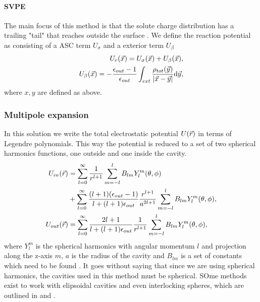 \documentclass[../master_thesis.tex]{subfiles}
\begin{document}
\paragraph{\ac{SVPE}}
The main focus of this method is that the solute charge distribution has a trailing
"tail" that reaches outside the surface \cite{Tomasi:2005ipa}. We define the
reaction potential as consisting of a \ac{ASC} term $U_{\sigma}$ and a exterior
term $U_{\beta}$
\begin{align}
  \begin{split}
    U_r(\vec{x}) = U_{\sigma}(\vec{x}) + U_{\beta}(\vec{x}),\\
    U_{\beta}(\vec{x}) = -\frac{\epsilon_{out} - 1}{\epsilon_{out}}\int_{ext} \frac{\rho_{tot}(\vec{y})}{\abs{\vec{x} - \vec{y}}} \text{d}\vec{y},
  \end{split}
\end{align}
where $x, y$ are defined as above.

\subsubsection{Multipole expansion}
In this solution we write the total electrostatic potential $U(\vec{r})$ in terms
of Legendre polynomials. This way the potential is reduced to a set of two
spherical harmonics functions, one outside and one inside the cavity.
\begin{align}
  \begin{split}
    U_{in}(\vec{r}) &= \sum_{l=0}^{\infty}\frac{1}{r^{l+1}}\sum^l_{m=-l}B_{lm}Y^m_l(\theta, \phi) \\
    &+ \sum_{l=0}^{\infty}\frac{(l+1)(\epsilon_{out} - 1)}{l + (l+1)\epsilon_{out}} \frac{r^{l+1}}{a^{2l+1}}\sum^l_{m=-l}B_{lm}Y^m_l(\theta, \phi),\\
    U_{out}(\vec{r})
    &=\sum_{l=0}^{\infty}\frac{2l+1}{l+(l+1)\epsilon_{out}}\frac{1}{r^{l+1}}\sum^l_{m=-l}B_{lm}Y^m_l(\theta, \phi),
  \end{split}
\end{align}
where $Y^m_l$ is the spherical harmonics with angular momentum $l$ and projection
along the z-axis $m$, $a$ is the radius of the cavity and $B_{lm}$ is a set of
constants which need to be found \cite{Tomasi:1994wt}. It goes without saying that
since we are using spherical harmonics, the cavities used in this method must be
spherical. SOme methods exist to work with elipsoidal cavities and even interlocking
spheres, which are outlined in \cite{Tomasi:1994wt} and \cite{Tomasi:2005ipa}.
\end{document}
